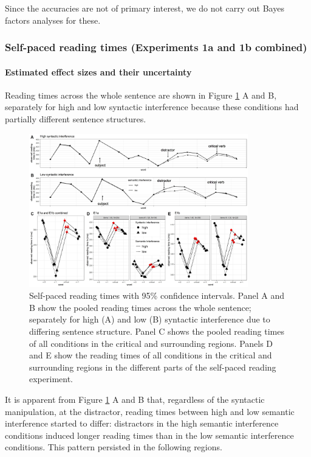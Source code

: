 \documentclass[a4paper, man, floatsintext]{apa7}
\begin{document}
Since the accuracies are not of primary interest, we do not carry out Bayes factors analyses for these.

\subsubsection{Self-paced reading times (Experiments 1a and 1b combined)}

\paragraph{Estimated effect sizes and their uncertainty}

Reading times across the whole sentence are shown in Figure \ref{fig:whole_sentence} A and B, separately for high and low syntactic interference because these conditions had partially different sentence structures. 

\begin{figure}
    \caption{Self-paced reading times with 95\% confidence intervals. Panel A and B show the pooled reading times across the whole sentence; separately for high (A) and low (B) syntactic interference due to differing sentence structure. Panel C shows the pooled reading times of all conditions in the critical and surrounding regions. Panels D and E show the reading times of all conditions in the critical and surrounding regions in the different parts of the self-paced reading experiment.}
    \label{fig:whole_sentence}
    \centering
    \includegraphics[width=0.85\textwidth]{images/Pandora_all_wholesentence_pooled_zoom_exp.jpg}
\end{figure}
\clearpage

It is apparent from Figure \ref{fig:whole_sentence} A and B that, regardless of the syntactic manipulation, at the distractor, reading times between high and low semantic interference started to differ: distractors in the high semantic interference conditions induced longer reading times than in the low semantic interference conditions. This pattern persisted in the following regions.
\end{document}
